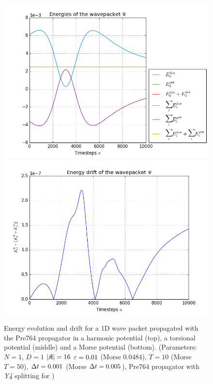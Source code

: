 \begin{figure}[ht]
	\includegraphics[width=.45\textwidth]{figures/morse_1D_Pre764_energies.png}
	\includegraphics[width=.45\textwidth]{figures/morse_1D_Pre764_drift.png}
	\caption{Energy evolution and drift for a 1D wave packet propagated with the Pre764 propagator in a harmonic potential (top), a torsional potential (middle) and a Morse potential (bottom).
	(Parameters: $N=1$, $D=1$ $|\mathfrak{K}|=16$ $\varepsilon=0.01$ (Morse $0.0484$), $T=10$ (Morse $T=50$), $\Delta t=0.001$ (Morse $\Delta t=0.005$), Pre764 propagator with \emph{Y4} splitting for )}
	\label{fig:energy_Pre764}
\end{figure}
